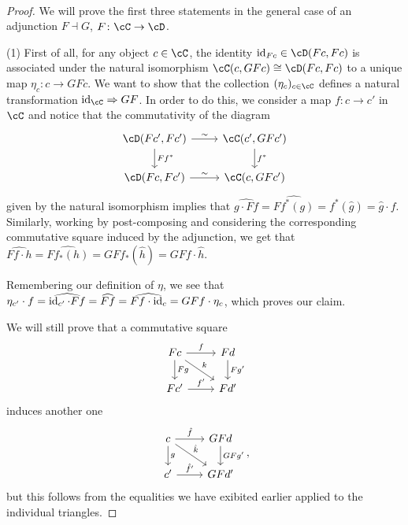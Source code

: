 \documentclass[a4paper,11pt,openany]{scrartcl}
\begin{document}
~\\
\begin{proof}
    We will prove the first three statements in the general case of an adjunction
    $F\dashv G$, $F\colon\cC\rightarrow\cD$.

    (1) First of all, for any object $c\in\cC$, the identity $\id_{Fc}\in\cD(Fc,Fc)$
    is associated under the natural isomorphism $\cC(c,GFc)\cong\cD(Fc,Fc)$ to a
    unique map $\eta_c\colon c\rightarrow GFc$. We want to show that the
    collection $(\eta_c)_{c\in\cC}$ defines a natural transformation
    $\id_\cC\Rightarrow GF$. In order to do this, we consider a map
    $f\colon c\rightarrow c'$ in $\cC$ and notice that the commutativity of the
    diagram
    \[
        \begin{tikzcd}
            \cD(Fc',Fc')\ar[r, "\sim"]\ar[d, "Ff^*"]
            & \cC(c',GFc')\ar[d, "f^*"] \\
            \cD(Fc,Fc')\ar[r, "\sim"]
            & \cC(c,GFc')
        \end{tikzcd}
    \]
    given by the natural isomorphism implies that
    $\widehat{g\cdot Ff}=\widehat{Ff^*(g)}=f^*(\hat{g})=\hat{g}\cdot f$.
    Similarly, working by post-composing and considering the corresponding
    commutative square induced by the adjunction, we get that
    $\widehat{Ff\cdot h}=\widehat{Ff_*(h)}=GFf_*(\hat{h})=GFf\cdot\hat{h}$.

    Remembering our definition of $\eta$, we see that $\eta_{c'}\cdot
    f=\widehat{\operatorname{id}_{c'}\cdot
    Ff}=\widehat{Ff}=\widehat{Ff\cdot\operatorname{id}_c}=GFf\cdot\eta_c$, which proves our
    claim.

    We will still prove that a commutative square
    \[
        \begin{tikzcd}
            Fc\ar[r, "f"]\ar[dr, "k"]\ar[d, "Fg"]
            & Fd\ar[d, "Fg'"] \\
            Fc'\ar[r, "f'"]
            & Fd'
        \end{tikzcd}
    \]
    induces another one
    \[
        \begin{tikzcd}
            c\ar[r, "\hat{f}"]\ar[dr, "\hat{k}"]\ar[d, "g"]
            & GFd\ar[d, "GFg'"] \\
            c'\ar[r, "\hat{f'}"]
            & GFd'
        \end{tikzcd},
    \]
    but this follows from the equalities we have exibited earlier applied to
    the individual triangles.


\end{proof}
\end{document}
